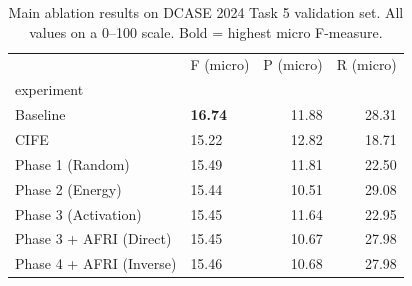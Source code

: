 \begin{table}
\centering
\caption{Main ablation results on DCASE 2024 Task 5 validation set. All values on a 0--100 scale. Bold = highest micro F-measure.}
\label{tab:main_results}
\begin{tabular}{llrr}
\toprule
{} &       F (micro) &  P (micro) &  R (micro) \\
experiment               &                 &            &            \\
\midrule
Baseline                 &  \textbf{16.74} &      11.88 &      28.31 \\
CIFE                     &           15.22 &      12.82 &      18.71 \\
Phase 1 (Random)         &           15.49 &      11.81 &      22.50 \\
Phase 2 (Energy)         &           15.44 &      10.51 &      29.08 \\
Phase 3 (Activation)     &           15.45 &      11.64 &      22.95 \\
Phase 3 + AFRI (Direct)  &           15.45 &      10.67 &      27.98 \\
Phase 4 + AFRI (Inverse) &           15.46 &      10.68 &      27.98 \\
\bottomrule
\end{tabular}
\end{table}
